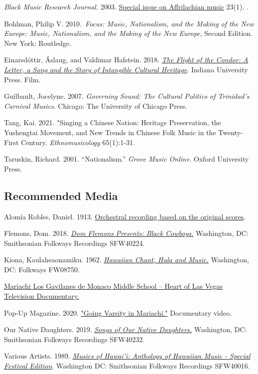 \documentclass[twoside]{article}
\begin{document}
\begin{hangparas}{15pt}{1}
  \emph{Black Music Research Journal.} 2003. \href{https://www.jstor.org/stable/i369762}{Special issue on  Affrilachian music} 23(1). .

  Bohlman, Philip V. 2010.~\emph{Focus: Music, Nationalism, and
  the Making of the New Europe: Music, Nationalism, and the Making of the
  New Europe}, Second Edition. New York: Routledge.

  Einarsdóttir, Áslaug, and Valdimar Hafstein. 2018. \href{http://flightofthecondorfilm.com/}{\emph{The
  Flight of the Condor: A Letter, a Song and the Story of Intangible
  Cultural Heritage}}. Indiana University Press. Film.

  Guilbault, Jocelyne. 2007. \emph{Governing Sound: The
  Cultural Politics of Trinidad's Carnival Musics}. Chicago: The
  University of Chicago Press.

  Tang, Kai. 2021. "Singing a Chinese Nation: Heritage Preservation, the Yushengtai Movement, and New Trends in Chinese Folk Music in the Twenty-First Century. \emph{Ethnomusicology} 65(1):1-31.

  Taruskin, Richard. 2001. ``Nationalism.'' \emph{Grove Music
  Online}. Oxford University Press.
\end{hangparas}

\bigskip
\hypertarget{recommended-media}{%
\subsection*{Recommended Media}\label{recommended-media}}

\begin{hangparas}{15pt}{1}
  Alomía Robles, Daniel. 1913. \href{https://www.youtube.com/watch?v=Rvp-RFpgXA0}{Orchestral recording based on the original scores}.

  Flemons, Dom. 2018. \href{https://folkways.si.edu/dom-flemons/black-cowboys}{\emph{Dom Flemons Presents: Black Cowboys.}} Washington, DC: Smithsonian Folkways Recordings SFW40224.

  Kiona, Kaulaheaonamiku. 1962. \href{https://folkways.si.edu/kaulaheaonamiku-kiona/hawaiian-chant-hula-and-music/hawaii/music/album/smithsonian}{\emph{Hawaiian Chant, Hula and Music.}} Washington, DC: Folkways FW08750.
    
  \href{https://youtu.be/ezTKNGGJuto}{Mariachi Los Gavilanes de Monaco Middle School -- Heart of Las Vegas Television Documentary.}

  Pop-Up Magazine. 2020. \href{https://www.youtube.com/watch?v=RXywZ2CXcnk}{"Going Varsity in Mariachi."}
  Documentary video.

  Our Native Daughters. 2019. \href{https://folkways.si.edu/songs-of-our-native-daughters}{\emph{Songs of Our Native Daughters.}} Washington, DC: Smithsonian Folkways Recordings SFW40232.
  
  Various Artists. 1989. \href{https://folkways.si.edu/musics-of-hawaii-anthology-of-hawaiian-music-special-festival-edition/album/smithsonian}{\emph{Musics of Hawai'i: Anthology of Hawaiian Music - Special Festival Edition}}. Washington DC: Smithsonian Folkways Recordings SFW40016.
\end{hangparas}
\end{document}
